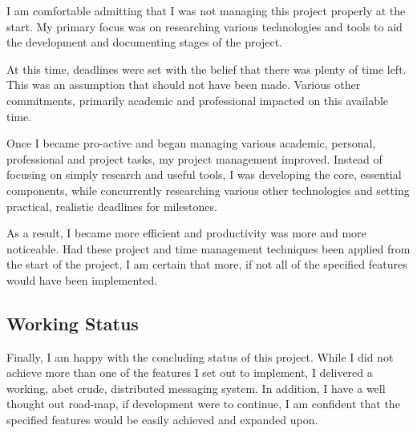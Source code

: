 I am comfortable admitting that I was not managing this project properly
at the start. My primary focus was on researching various technologies
and tools to aid the development and documenting stages of the project.


At this time, deadlines were set with the belief that there was plenty
of time left. This was an assumption that should not have been made.
Various other commitments, primarily academic and professional impacted
on this available time.


Once I became pro-active and began managing various academic, personal,
professional and project tasks, my project management improved. Instead
of focusing on simply research and useful tools, I was developing the
core, essential components, while concurrently researching various other
technologies and setting practical, realistic deadlines for milestones.


As a result, I became more efficient and productivity was more and more
noticeable. Had these project and time management techniques been
applied from the start of the project, I am certain that more, if not
all of the specified features would have been implemented.

\subsection{Working Status}

Finally, I am happy with the concluding status of this project. While I
did not achieve more than one of the features I set out to implement, I
delivered a working, abet crude, distributed messaging system. In
addition, I have a well thought out road-map, if development were to
continue, I am confident that the specified features would be easily 
achieved and expanded upon. 

